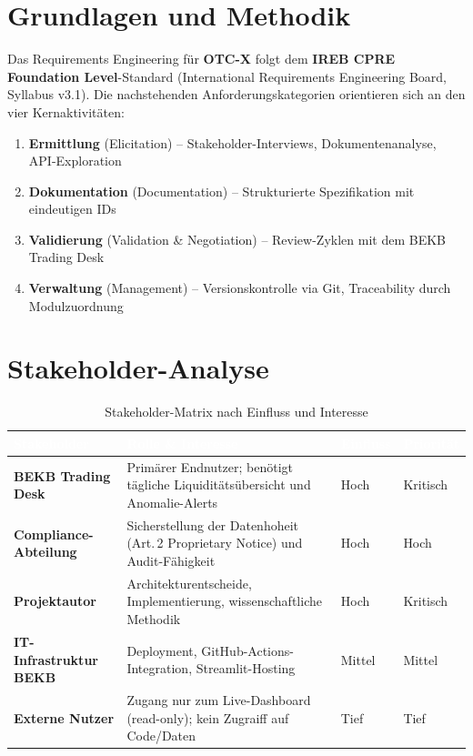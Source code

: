 \documentclass[12pt, a4paper, oneside]{report}
\newcommand{\term}[1]{\textcolor{swissred}{\textsf{\textbf{#1}}}}
\begin{document}
\section{Grundlagen und Methodik}

Das Requirements Engineering für \term{OTC-X} folgt dem \textbf{IREB CPRE Foundation Level}-Standard (International Requirements Engineering Board, Syllabus v3.1). Die nachstehenden Anforderungskategorien orientieren sich an den vier Kernaktivitäten:

\begin{enumerate}[label=\textcolor{swissred}{\textbf{\arabic*.}}]
  \item \textbf{Ermittlung} (Elicitation) -- Stakeholder-Interviews, Dokumentenanalyse, API-Exploration
  \item \textbf{Dokumentation} (Documentation) -- Strukturierte Spezifikation mit eindeutigen IDs
  \item \textbf{Validierung} (Validation \& Negotiation) -- Review-Zyklen mit dem BEKB Trading Desk
  \item \textbf{Verwaltung} (Management) -- Versionskontrolle via Git, Traceability durch Modulzuordnung
\end{enumerate}

\section{Stakeholder-Analyse}

\begin{table}[H]
\centering
\caption{Stakeholder-Matrix nach Einfluss und Interesse}
\begin{tabularx}{\textwidth}{>{\bfseries\sffamily}l X l l}
  \toprule
  \rowcolor{darknavy}  \textcolor{white}{Stakeholder} & \textcolor{white}{Rolle \& Interesse} & \textcolor{white}{Einfluss} & \textcolor{white}{Priorität} \\
  \midrule
  BEKB Trading Desk     & Primärer Endnutzer; benötigt tägliche Liquiditätsübersicht und Anomalie-Alerts & Hoch  & Kritisch \\
  Compliance-Abteilung  & Sicherstellung der Datenhoheit (Art.\,2 Proprietary Notice) und Audit-Fähigkeit & Hoch  & Hoch \\
  Projektautor          & Architekturentscheide, Implementierung, wissenschaftliche Methodik & Hoch  & Kritisch \\
  IT-Infrastruktur BEKB & Deployment, GitHub-Actions-Integration, Streamlit-Hosting & Mittel & Mittel \\
  Externe Nutzer        & Zugang nur zum Live-Dashboard (read-only); kein Zugraiff auf Code/Daten & Tief  & Tief \\
  \bottomrule
\end{tabularx}
\end{table}
\end{document}
